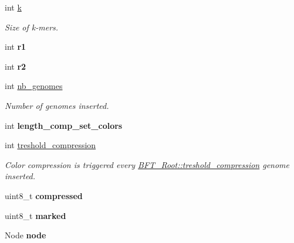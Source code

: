 \begin{DoxyCompactItemize}
\item 
int \hyperlink{structBFT__Root_ac496349ff4cba68727c5e38d4200848e}{k}
\begin{DoxyCompactList}\small\item\em Size of k-\/mers. \end{DoxyCompactList}\item 
int {\bfseries r1}\hypertarget{structBFT__Root_a5f9133c413279e9184248ee9df58377e}{}\label{structBFT__Root_a5f9133c413279e9184248ee9df58377e}

\item 
int {\bfseries r2}\hypertarget{structBFT__Root_a2319c2ec89e8196fad6ab66f46f52f93}{}\label{structBFT__Root_a2319c2ec89e8196fad6ab66f46f52f93}

\item 
int \hyperlink{structBFT__Root_aaa57149b486231b370c0d9287e7e5328}{nb\+\_\+genomes}
\begin{DoxyCompactList}\small\item\em Number of genomes inserted. \end{DoxyCompactList}\item 
int {\bfseries length\+\_\+comp\+\_\+set\+\_\+colors}\hypertarget{structBFT__Root_ab6dc409b011bf32096366e936266d871}{}\label{structBFT__Root_ab6dc409b011bf32096366e936266d871}

\item 
int \hyperlink{structBFT__Root_ac791b1bb0df480c8574095bf0444cc64}{treshold\+\_\+compression}
\begin{DoxyCompactList}\small\item\em Color compression is triggered every \hyperlink{structBFT__Root_ac791b1bb0df480c8574095bf0444cc64}{B\+F\+T\+\_\+\+Root\+::treshold\+\_\+compression} genome inserted. \end{DoxyCompactList}\item 
uint8\+\_\+t {\bfseries compressed}\hypertarget{structBFT__Root_af43416c7309bc382c787d59dac51434e}{}\label{structBFT__Root_af43416c7309bc382c787d59dac51434e}

\item 
uint8\+\_\+t {\bfseries marked}\hypertarget{structBFT__Root_ae5f00a6cb4a5d56158d869aec2e87a38}{}\label{structBFT__Root_ae5f00a6cb4a5d56158d869aec2e87a38}

\item 
Node {\bfseries node}\hypertarget{structBFT__Root_a996c0a58aa4e6396bde1fd3037b79f03}{}\label{structBFT__Root_a996c0a58aa4e6396bde1fd3037b79f03}

\end{DoxyCompactItemize}


